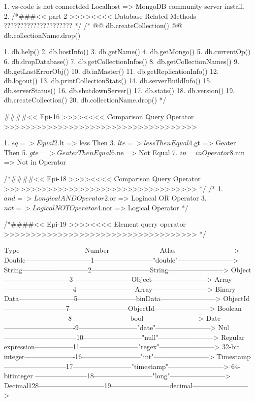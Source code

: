 1. vs-code is not connectded Localhost => MongoDB community server install.
2. /*###<< part-2 >>>><<<< Database Related Methods ????????????????????? */
/*
@@ db.createCollection()
@@ db.collectionName.drop()

1. db.help()
2. db.hostInfo()
3. db.getName()
4. db.getMongo()
5. db.currentOp()
6. db.dropDatabase()
7. db.getCollectionInfos()
8. db.getCollectionNames()
9. db.getLastErrorObj()
10. db.inMaster()
11. db.getReplicationInfo()
12. db.logout()
13. db.printCollectionStats()
14. db.serverBuildInfo()
15. db.serverStatus() 
16. db.shutdownServer()  
17. db.stats()
18. db.version()
19. db.createCollection()
20. db.collectionName.drop()
*/

####<< Epi-16 >>>><<<< Comparison Query Operator >>>>>>>>>>>>>>>>>>>>>>>>>>>>>>>>>>>> 

1. $eq => Equal 
2. $lt => less Then 
3. $lte => less Then Equal
4. $gt => Geater Then
5. $gte => Geater Then Equal
6. $ne => Not Equal
7. $in = in Operator
8. $nin => Not in Operator

/*####<< Epi-18 >>>><<<< Comparison Query Operator >>>>>>>>>>>>>>>>>>>>>>>>>>>>>>>>>>>> */
/* 
1. $and => Longical AND Operator
2. $or => Logincal OR Operator
3. $not => Logical NOT Operator
4. $nor => Logical Operator
*/

/*####<< Epi-19 >>>><<<< Element query operator >>>>>>>>>>>>>>>>>>>>>>>>>>>>>>>>>>>> */

Type-----------------------------Number----------------------Atlas--------------------------> 
Double-----------------------------1--------------------------"double"------------------------>
String-----------------------------2--------------------------String------------------------>
Object-----------------------------3--------------------------Object------------------------>
Array------------------------------4--------------------------Array------------------------>
Binary Data------------------------5--------------------------binData------------------------>
ObjectId---------------------------7--------------------------ObjectId------------------------>
Boolean----------------------------8--------------------------bool------------------------>
Date-------------------------------9--------------------------"date"------------------------>
Nul--------------------------------10--------------------------"null"------------------------>
Regular expression-----------------11--------------------------"regex"------------------------>
32-bit integer----------------------16--------------------------"int"------------------------>
Timestamp---------------------------17--------------------------"timestamp"------------------------>
64-bitinteger -----------------------18--------------------------"long"------------------------>
Decimal128-----------------------------19--------------------------decimal------------------------>
